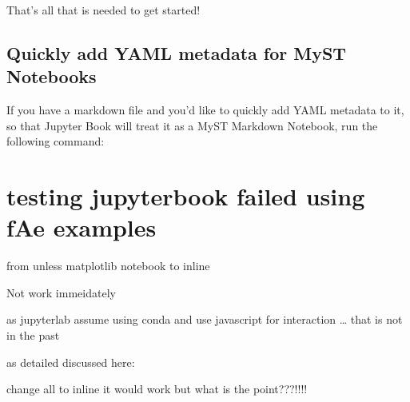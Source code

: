 \documentclass[letterpaper,10pt,english]{jupyterBook}
\begin{document}
\sphinxAtStartPar
That’s all that is needed to get started!


\section{Quickly add YAML metadata for MyST Notebooks}
\label{\detokenize{markdown-notebooks:quickly-add-yaml-metadata-for-myst-notebooks}}
\sphinxAtStartPar
If you have a markdown file and you’d like to quickly add YAML metadata to it, so that Jupyter Book will treat it as a MyST Markdown Notebook, run the following command:

\begin{sphinxVerbatim}[commandchars=\\\{\}]
   
\end{sphinxVerbatim}

\sphinxstepscope


\chapter{testing jupyter\sphinxhyphen{}book failed using fAe examples}
\label{\detokenize{fAe:testing-jupyter-book-failed-using-fae-examples}}\label{\detokenize{fAe::doc}}
\sphinxAtStartPar
from 
unless matplotlib notebook to inline

\sphinxAtStartPar
Not work immeidately

\sphinxAtStartPar
as jupyterlab assume using conda and use javascript for
interaction … that is not in the past 

\sphinxAtStartPar
as detailed discussed here: 

\sphinxAtStartPar
change all to inline it would work but what is the point???!!!!
\end{document}
